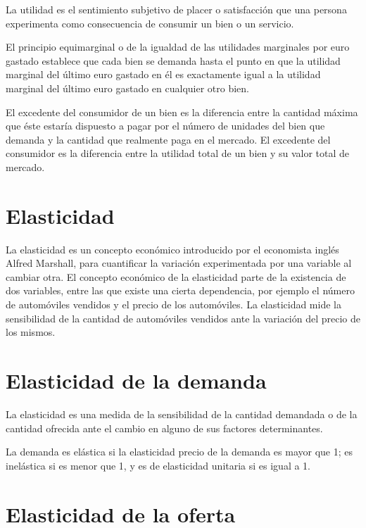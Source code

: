 \documentclass[
]{krantz}
\begin{document}
La utilidad es el sentimiento subjetivo de placer o satisfacción que una persona experimenta como consecuencia de consumir un bien o un servicio.

El principio equimarginal o de la igualdad de las utilidades marginales por euro gastado establece que cada bien se demanda hasta el punto en que la utilidad marginal del último euro gastado en él es exactamente igual a la utilidad marginal del último euro gastado en cualquier otro bien.

El excedente del consumidor de un bien es la diferencia entre la cantidad máxima que éste estaría dispuesto a pagar por el número de unidades del bien que demanda y la cantidad que realmente paga en el mercado. El excedente del consumidor es la diferencia entre la utilidad total de un bien y su valor total de mercado.

\hypertarget{elasticidad}{%
\section{Elasticidad}\label{elasticidad}}

La elasticidad es un concepto económico introducido por el economista inglés Alfred Marshall, para cuantificar la variación experimentada por una variable al cambiar otra. El concepto económico de la elasticidad parte de la existencia de dos variables, entre las que existe una cierta dependencia, por ejemplo el número de automóviles vendidos y el precio de los automóviles. La elasticidad mide la sensibilidad de la cantidad de automóviles vendidos ante la variación del precio de los mismos.

\hypertarget{elasticidad-de-la-demanda}{%
\section{Elasticidad de la demanda}\label{elasticidad-de-la-demanda}}

La elasticidad es una medida de la sensibilidad de la cantidad demandada o de la cantidad ofrecida ante el cambio en alguno de sus factores determinantes.

La demanda es elástica si la elasticidad precio de la demanda es mayor que 1; es inelástica si es menor que 1, y es de elasticidad unitaria si es igual a 1.

\hypertarget{elasticidad-de-la-oferta}{%
\section{Elasticidad de la oferta}\label{elasticidad-de-la-oferta}}
\end{document}
